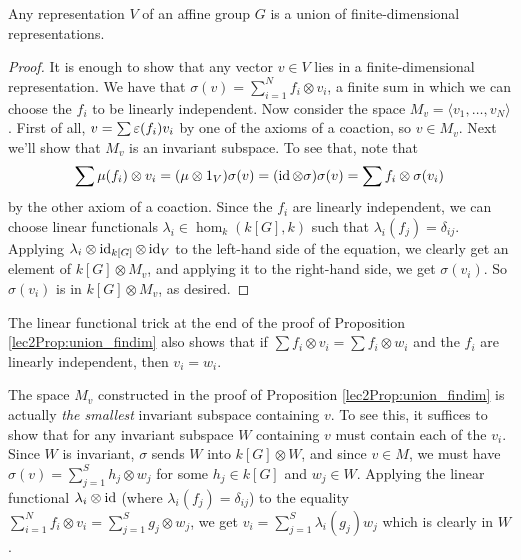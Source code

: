 \begin{proposition}\label{lec2Prop:union_findim}
 Any representation $V$ of an affine group $G$ is a union of finite-dimensional representations.
\end{proposition}
\begin{proof}
 It is enough to show that any vector $v\in V$ lies in a finite-dimensional representation. We have that $\sigma(v)=\sum_{i=1}^N f_i\otimes v_i$, a finite sum in which we can choose the $f_i$ to be linearly independent. Now consider the space $M_v=\langle v_1,\dots, v_N\rangle$. First of all, $v=\sum \varepsilon(f_i)v_i$ by one of the axioms of a coaction, so $v\in M_v$. Next we'll show that $M_v$ is an invariant subspace. To see that, note that 
 \[
  \sum \mu(f_i)\otimes v_i = (\mu\otimes 1_V)\sigma(v) = (\operatorname{id}\otimes \sigma)\sigma(v) = \sum f_i\otimes \sigma(v_i)
 \]
 by the other axiom of a coaction. Since the $f_i$ are linearly independent, we can choose linear functionals $\lambda_i\in \hom_k(k[G],k)$ such that $\lambda_i(f_j)=\delta_{ij}$. Applying $\lambda_i\otimes \operatorname{id}_{k[G]}\otimes \operatorname{id}_V$ to the left-hand side of the equation, we clearly get an element of $k[G]\otimes M_v$, and applying it to the right-hand side, we get $\sigma(v_i)$. So $\sigma(v_i)$ is in $k[G]\otimes M_v$, as desired.
\end{proof}
\begin{remark}\label{lec2Rmk:lin_idpt_trick}
 The linear functional trick at the end of the proof of Proposition \ref{lec2Prop:union_findim} also shows that if $\sum f_i\otimes v_i = \sum f_i\otimes w_i$ and the $f_i$ are linearly independent, then $v_i=w_i$.
\end{remark}
\begin{remark}\label{lec2Rmk:M_v_minimal}
 The space $M_v$ constructed in the proof of Proposition \ref{lec2Prop:union_findim} is actually \emph{the smallest} invariant subspace containing $v$. To see this, it suffices to show that for any invariant subspace $W$ containing $v$ must contain each of the $v_i$. Since $W$ is invariant, $\sigma$ sends $W$ into $k[G]\otimes W$, and since $v\in M$, we must have $\sigma(v)=\sum_{j=1}^S h_j\otimes w_j$ for some $h_j\in k[G]$ and $w_j\in W$. Applying the linear functional $\lambda_i\otimes \operatorname{id}$ (where $\lambda_i(f_j)=\delta_{ij}$) to the equality $\sum_{i=1}^N f_i\otimes v_i=\sum_{j=1}^S g_j\otimes w_j$, we get $v_i=\sum_{j=1}^S \lambda_i(g_j)w_j$ which is clearly in $W$.
\end{remark}


